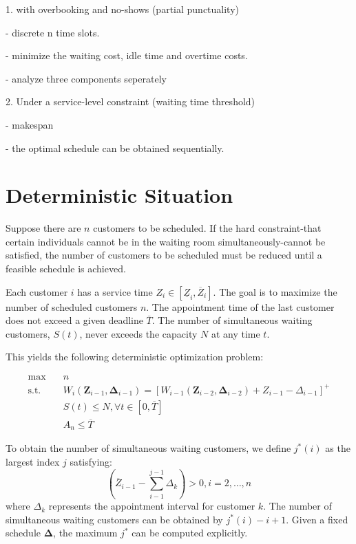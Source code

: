 \documentclass{article}
\newcommand{\Z}{\mathbf{Z}}
\newcommand{\D}{\bm{\Delta}}
\begin{document}
1. with overbooking and no-shows (partial punctuality)

- discrete n time slots.

- minimize the waiting cost, idle time and overtime costs.

- analyze three components seperately


2. Under a service-level constraint (waiting time threshold)

- makespan

- the optimal schedule can be obtained sequentially.


\section{Deterministic Situation}


Suppose there are $n$ customers to be scheduled. If the hard constraint-that certain individuals cannot be in the waiting room simultaneously-cannot be satisfied, the number of customers to be scheduled must be reduced until a feasible schedule is achieved.

Each customer $i$ has a service time $Z_{i} \in [\underline{Z}_{i}, \overline{Z}_{i}]$. The goal is to maximize the number of scheduled customers $n$. The appointment time of the last customer does not exceed a given deadline $\overline{T}$. The number of simultaneous waiting customers, $S(t)$, never exceeds the capacity $N$ at any time $t$.

This yields the following deterministic optimization problem:

\begin{equation}\label{deterministic_model}
    \begin{aligned}
        \max \quad & n \\
        \mbox{s.t.} \quad & W_{i}(\Z_{i-1}, \D_{i-1}) = [W_{i-1}(\Z_{i-2}, \D_{i-2}) + Z_{i-1} - \Delta_{i-1}]^{+}  \\
        & S(t) \leq N, \forall t  \in [0, \overline{T}] \\
        & A_{n} \leq \overline{T}
    \end{aligned}
\end{equation}


To obtain the number of simultaneous waiting customers, we define $j^{*}(i)$ as the largest index $j$ satisfying: 
$$(\overline{Z}_{i-1}- \sum_{i-1}^{j-1} \Delta_{k})> 0, i =2, \ldots, n$$ 
where $\Delta_{k}$ represents the appointment interval for customer $k$. The number of simultaneous waiting customers can be obtained by $j^{*}(i) -i +1$. Given a fixed schedule $\D$, the maximum $j^{*}$ can be computed explicitly.
\end{document}
